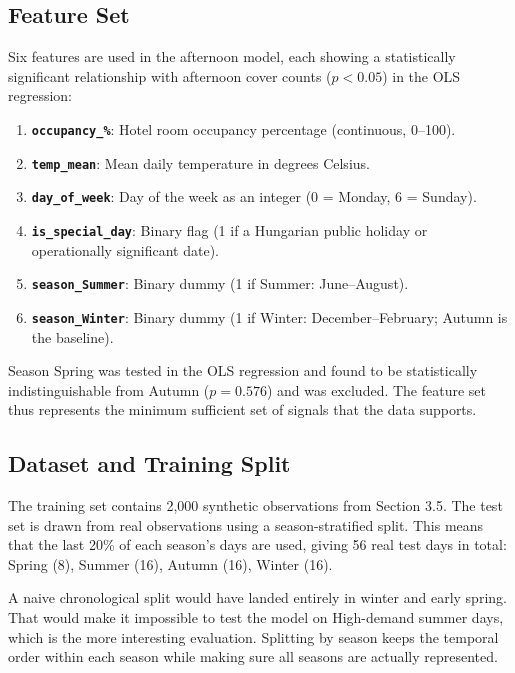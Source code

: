\documentclass[12pt,a4paper,oneside]{article}
\begin{document}
\subsection{Feature Set}

Six features are used in the afternoon model, each showing a statistically significant relationship with afternoon cover counts ($p < 0.05$) in the OLS regression:

\begin{enumerate}
    \item \textbf{\texttt{occupancy\_\%}}: Hotel room occupancy percentage (continuous, 0--100).
    \item \textbf{\texttt{temp\_mean}}: Mean daily temperature in degrees Celsius.
    \item \textbf{\texttt{day\_of\_week}}: Day of the week as an integer (0 = Monday, 6 = Sunday).
    \item \textbf{\texttt{is\_special\_day}}: Binary flag (1 if a Hungarian public holiday or operationally significant date).
    \item \textbf{\texttt{season\_Summer}}: Binary dummy (1 if Summer: June--August).
    \item \textbf{\texttt{season\_Winter}}: Binary dummy (1 if Winter: December--February; Autumn is the baseline).
\end{enumerate}

Season Spring was tested in the OLS regression and found to be statistically indistinguishable from Autumn ($p = 0.576$) and was excluded. The feature set thus represents the minimum sufficient set of signals that the data supports.

\subsection{Dataset and Training Split}

The training set contains 2,000 synthetic observations from Section 3.5. The test set is drawn from real observations using a season-stratified split. This means that the last 20\% of each season's days are used, giving 56 real test days in total: Spring (8), Summer (16), Autumn (16), Winter (16).

A naive chronological split would have landed entirely in winter and early spring. That would make it impossible to test the model on High-demand summer days, which is the more interesting evaluation. Splitting by season keeps the temporal order within each season while making sure all seasons are actually represented.
\end{document}
